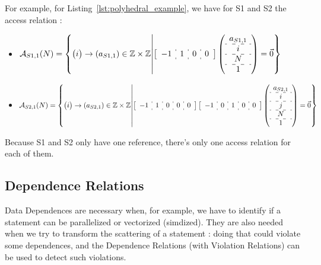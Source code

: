 \documentclass[paper=a4, fontsize=11pt]{scrartcl}
\numberwithin{equation}{section}        %
\numberwithin{figure}{section}          %
\numberwithin{table}{section}               %
\begin{document}
        For example, for Listing~\ref{lst:polyhedral_example}, we have for S1 and S2 the
        access relation :
        \begin{itemize}
            \item[]
                $
                \mathcal{A}_{S1,1}(N) = 
                \left\{
                \begin{pmatrix}i\end{pmatrix} \to \left(a_{S1,1}\right) \in \mathbb{Z}\times\mathbb{Z}
                    \middle|
                    \left[\begin{array}{c:c:c:c}-1 & 1 & 0 & 0 \end{array}\right]
                    \left(\begin{array}{c}a_{S1,1}\\\hdashline i\\\hdashline N\\\hdashline 1\end{array}\right)
                    = \vec{0}
                \right\}
                $
            
            \item[]
                $
                \mathcal{A}_{S2,1}(N) = 
                \left\{
                \begin{pmatrix}i\end{pmatrix} \to \left(a_{S2,1}\right) \in \mathbb{Z}\times\mathbb{Z}
                    \middle|
                    \left[\begin{array}{c:c:c:c:c}-1 & 1 & 0 & 0 & 0 \end{array}\right]
                    \left[\begin{array}{c:c:c:c:c}-1 & 0 & 1 & 0 & 0 \end{array}\right]
                    \left(\begin{array}{c}a_{S2,1}\\\hdashline i\\\hdashline j\\\hdashline N\\\hdashline 1\end{array}\right)
                    = \vec{0}
                \right\}
                $
        \end{itemize}

        Because S1 and S2 only have one reference, there's only one access relation for
        each of them.

    \subsection{Dependence Relations}
    \label{sec:dependence_relations}
        Data Dependences are necessary when, for example, we have to identify if a statement
        can be parallelized or vectorized (simdized). They are also needed when we try to
        transform the scattering of a statement : doing that could violate some dependences,
        and the Dependence Relations (with Violation Relations) can be used to detect such
        violations.
\end{document}
